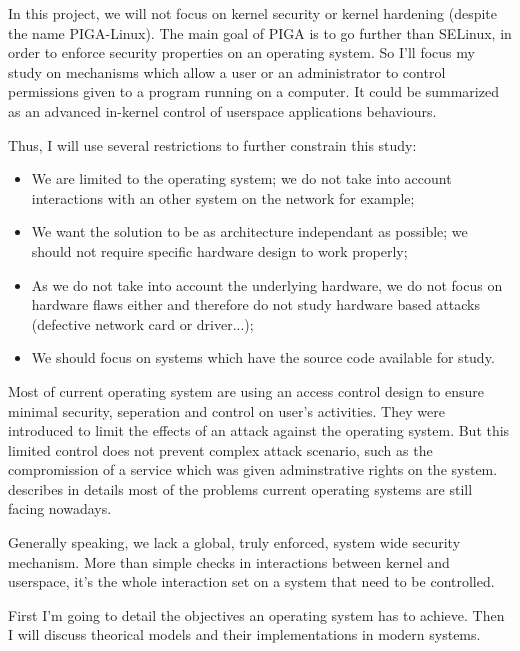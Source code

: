 \documentclass[pdftex,a4paper,titlepage,11pt]{article}
\begin{document}
\bigskip

In this project, we will not focus on kernel security or kernel hardening
(despite the name PIGA-Linux). The main goal of PIGA is to go further than
SELinux, in order to enforce security properties on an operating system. So I'll
focus my study on mechanisms which allow a user or an administrator to control
permissions given to a program running on a computer. It could be summarized as
an advanced in-kernel control of userspace applications behaviours.

\bigskip

Thus, I will use several restrictions to further constrain this study:
\begin{itemize}
	\item We are limited to the operating system; we do not take into account
interactions with an other system on the network for example;
	\item We want the solution to be as architecture independant as possible; we
should not require specific hardware design to work properly;
	\item As we do not take into account the underlying hardware, we do not
focus on hardware flaws either and therefore do not study hardware based attacks
(defective network card or driver...);
	\item We should focus on systems which have the source code available for
study.
\end{itemize}

\smallskip

Most of current operating system are using an access control design to ensure
minimal security, seperation and control on user's activities. They were
introduced to limit the effects of an attack against the operating system. But
this limited control does not prevent complex attack scenario, such as the
compromission of a service which was given adminstrative rights on the system.
\cite{inevitabilityoffailure1998} describes in details most of the problems
current operating
systems are still facing nowadays.

\bigskip

Generally speaking, we lack a global, truly enforced, system wide security
mechanism. More than simple checks in interactions between kernel and userspace,
it's the whole interaction set on a system that need to be controlled.

\bigskip

First I'm going to detail the objectives an operating system has to achieve.
Then I will discuss theorical models and their implementations in modern
systems.
\end{document}
